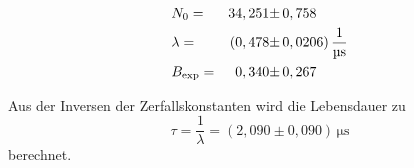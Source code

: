 \begin{align*}
    &N_0                      =& 34,251 \pm& \, 0,758                                 \\
    &\lambda            	  =& (0,478 \pm& \, 0,0206)  \, \unit{\dfrac{1}{\micro\second}} \\
    &B_{\text{exp}}           =& 0,340  \pm& \, 0,267
\end{align*}

Aus der Inversen der Zerfallskonstanten wird die Lebensdauer zu 
\begin{equation*}
    \tau = \dfrac{1}{\lambda} = \left(2,090  \pm 0,090 \right) \,\unit{\micro\second}
\end{equation*}
berechnet.
